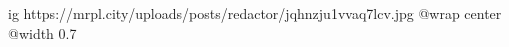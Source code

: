 
 
 
 
 

\ifcmt
  ig https://mrpl.city/uploads/posts/redactor/jqhnzju1vvaq7lcv.jpg
  @wrap center
  @width 0.7
\fi

